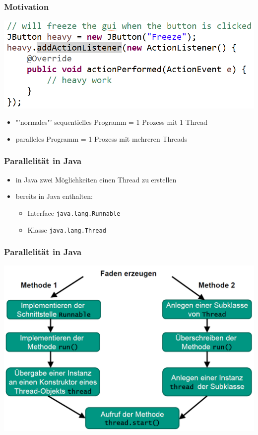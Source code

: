 \documentclass[18pt]{beamer}
\begin{document}
	
	\begin{frame}
		\frametitle{Motivation}
		\includegraphics[scale=0.34]{./pics/tut5/mot-par.png}
		\pause
		\begin{itemize}
			\item "'normales"' sequentielles Programm = 1 Prozess mit 1 Thread
			\item paralleles Programm = 1 Prozess mit mehreren Threads
		\end{itemize}
	\end{frame}

	\begin{frame}
		\frametitle{Parallelität in Java}
		\begin{itemize}
			\item in Java zwei Möglichkeiten einen Thread zu erstellen
			\item bereits in Java enthalten:
			\begin{itemize}
				\item Interface \texttt{java.lang.Runnable}
				\item Klasse \texttt{java.lang.Thread}
			\end{itemize}
		\end{itemize}
	\end{frame}

	\begin{frame}
		\frametitle{Parallelität in Java}
		\includegraphics[scale=0.34]{./pics/tut5/crea-thr.png}
	\end{frame}
\end{document}
